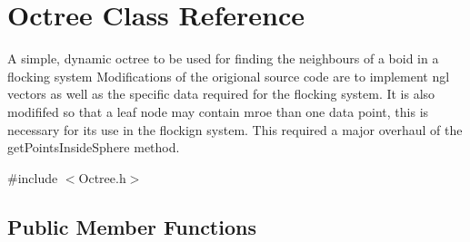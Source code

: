 \hypertarget{classOctree}{
\section{Octree Class Reference}
\label{classOctree}
}


A simple, dynamic octree to be used for finding the neighbours of a boid in a flocking system Modifications of the origional source code are to implement ngl vectors as well as the specific data required for the flocking system. It is also modififed so that a leaf node may contain mroe than one data point, this is necessary for its use in the flockign system. This required a major overhaul of the getPointsInsideSphere method.  


{\ttfamily \#include $<$Octree.h$>$}\subsection*{Public Member Functions}
